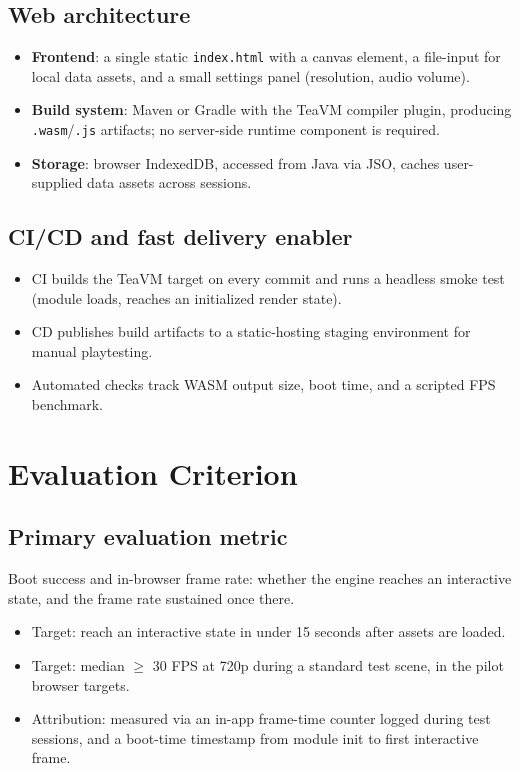\documentclass[11pt]{article}
\begin{document}
\subsection{Web architecture}
\begin{itemize}[itemsep=2pt]
  \item \textbf{Frontend}: a single static \texttt{index.html} with a canvas element, a file-input for local data assets, and a small settings panel (resolution, audio volume).
  \item \textbf{Build system}: Maven or Gradle with the TeaVM compiler plugin, producing \texttt{.wasm}/\texttt{.js} artifacts; no server-side runtime component is required.
  \item \textbf{Storage}: browser IndexedDB, accessed from Java via JSO, caches user-supplied data assets across sessions.
\end{itemize}

\subsection{CI/CD and fast delivery enabler}
\begin{itemize}[itemsep=2pt]
  \item CI builds the TeaVM target on every commit and runs a headless smoke test (module loads, reaches an initialized render state).
  \item CD publishes build artifacts to a static-hosting staging environment for manual playtesting.
  \item Automated checks track WASM output size, boot time, and a scripted FPS benchmark.
\end{itemize}

\section{Evaluation Criterion}

\subsection{Primary evaluation metric}
Boot success and in-browser frame rate: whether the engine reaches an interactive state, and the frame rate sustained once there.
\begin{itemize}[itemsep=2pt]
  \item Target: reach an interactive state in under 15 seconds after assets are loaded.
  \item Target: median $\geq$ 30 FPS at 720p during a standard test scene, in the pilot browser targets.
  \item Attribution: measured via an in-app frame-time counter logged during test sessions, and a boot-time timestamp from module init to first interactive frame.
\end{itemize}
\end{document}
